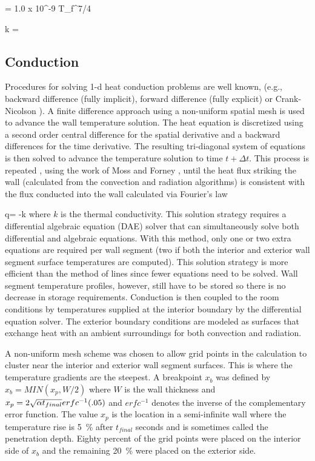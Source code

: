 \be \alpha = 1.0 x 10^{-9} T_f^{7/4} \ee

\be k =  \ee

 \subsection{Conduction}

 Procedures for solving 1-d heat conduction problems are well known, (e.g., backward difference (fully implicit), forward difference (fully explicit) or Crank-Nicolson \cite{Golub:1989}).  A finite difference approach  using a non-uniform spatial mesh is used to advance the wall temperature solution.  The heat equation is discretized using a second order central difference for the spatial derivative and a backward differences for the time derivative.  The resulting tri-diagonal system of equations is then solved to advance the temperature solution to time $t+\Delta t$.  This process is repeated , using the work of Moss and Forney \cite{Moss:1992},  until  the heat flux striking the wall (calculated from the convection and radiation algorithms) is consistent with the flux conducted into the wall calculated via Fourier's law

 \be q\dprime = -k  \ee
where $k$ is the thermal conductivity.  This solution strategy requires a differential algebraic equation (DAE) solver that can simultaneously solve both differential and algebraic equations.  With this method, only one or two extra equations are required per wall segment (two if both the interior and exterior wall segment surface temperatures are computed).  This solution strategy is more efficient than the method of lines since fewer equations need to be solved.  Wall segment temperature profiles, however, still have to be stored so there is no decrease in storage requirements.  Conduction is then coupled to the room conditions by temperatures supplied at the interior boundary by the differential equation solver.  The exterior boundary conditions are modeled as surfaces that exchange heat with an ambient surroundings for both convection and radiation.

A non-uniform mesh scheme was chosen to allow grid points in the calculation to cluster near the interior and exterior wall segment surfaces.  This is where the temperature gradients are the steepest.  A breakpoint  $x_b$ was defined by $x_b = MIN(x_p, W/2)$ where $W$ is the wall thickness and $x_p = 2 \sqrt{\alpha t_{final}} erfc^{-1} { \left( {.05} \right) }$ and $erfc^{-1}$ denotes the inverse of the complementary error function.  The value $x_p$ is the location in a semi-infinite wall where the temperature rise is 5~\% after $t_{final}$ seconds and is sometimes called the penetration depth.  Eighty percent of the grid points were placed on the interior side of $x_b$ and the remaining 20~\% were placed on the exterior side.

